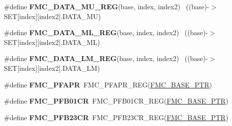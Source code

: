 \begin{DoxyCompactItemize}
\item 
\hypertarget{group___f_m_c___register___accessor___macros_gaa63410316b4d70fba198031bab2b08f1}{}\#define {\bfseries F\+M\+C\+\_\+\+D\+A\+T\+A\+\_\+\+M\+U\+\_\+\+R\+E\+G}(base,  index,  index2)          ~((base)-\/$>$S\+E\+T\mbox{[}index\mbox{]}\mbox{[}index2\mbox{]}.D\+A\+T\+A\+\_\+\+M\+U)\label{group___f_m_c___register___accessor___macros_gaa63410316b4d70fba198031bab2b08f1}

\item 
\hypertarget{group___f_m_c___register___accessor___macros_ga1bd4a1135ffc4459d3076960c447ed7c}{}\#define {\bfseries F\+M\+C\+\_\+\+D\+A\+T\+A\+\_\+\+M\+L\+\_\+\+R\+E\+G}(base,  index,  index2)          ~((base)-\/$>$S\+E\+T\mbox{[}index\mbox{]}\mbox{[}index2\mbox{]}.D\+A\+T\+A\+\_\+\+M\+L)\label{group___f_m_c___register___accessor___macros_ga1bd4a1135ffc4459d3076960c447ed7c}

\item 
\hypertarget{group___f_m_c___register___accessor___macros_ga6db1fe5c813156e3d9c01e453fc3801f}{}\#define {\bfseries F\+M\+C\+\_\+\+D\+A\+T\+A\+\_\+\+L\+M\+\_\+\+R\+E\+G}(base,  index,  index2)          ~((base)-\/$>$S\+E\+T\mbox{[}index\mbox{]}\mbox{[}index2\mbox{]}.D\+A\+T\+A\+\_\+\+L\+M)\label{group___f_m_c___register___accessor___macros_ga6db1fe5c813156e3d9c01e453fc3801f}

\item 
\hypertarget{group___f_m_c___register___accessor___macros_gafb8a8e5f889afe248ded426a27574f2e}{}\#define {\bfseries F\+M\+C\+\_\+\+P\+F\+A\+P\+R}~F\+M\+C\+\_\+\+P\+F\+A\+P\+R\+\_\+\+R\+E\+G(\hyperlink{group___f_m_c___peripheral_ga0a740437b573e32e6b932bf729485fd9}{F\+M\+C\+\_\+\+B\+A\+S\+E\+\_\+\+P\+T\+R})\label{group___f_m_c___register___accessor___macros_gafb8a8e5f889afe248ded426a27574f2e}

\item 
\hypertarget{group___f_m_c___register___accessor___macros_gaa1d528ba7a7b8ab4a6613b0205489003}{}\#define {\bfseries F\+M\+C\+\_\+\+P\+F\+B01\+C\+R}~F\+M\+C\+\_\+\+P\+F\+B01\+C\+R\+\_\+\+R\+E\+G(\hyperlink{group___f_m_c___peripheral_ga0a740437b573e32e6b932bf729485fd9}{F\+M\+C\+\_\+\+B\+A\+S\+E\+\_\+\+P\+T\+R})\label{group___f_m_c___register___accessor___macros_gaa1d528ba7a7b8ab4a6613b0205489003}

\item 
\hypertarget{group___f_m_c___register___accessor___macros_ga59fc6858356a8dcf104a28c5bcb9f7b0}{}\#define {\bfseries F\+M\+C\+\_\+\+P\+F\+B23\+C\+R}~F\+M\+C\+\_\+\+P\+F\+B23\+C\+R\+\_\+\+R\+E\+G(\hyperlink{group___f_m_c___peripheral_ga0a740437b573e32e6b932bf729485fd9}{F\+M\+C\+\_\+\+B\+A\+S\+E\+\_\+\+P\+T\+R})\label{group___f_m_c___register___accessor___macros_ga59fc6858356a8dcf104a28c5bcb9f7b0}


\end{DoxyCompactItemize}
